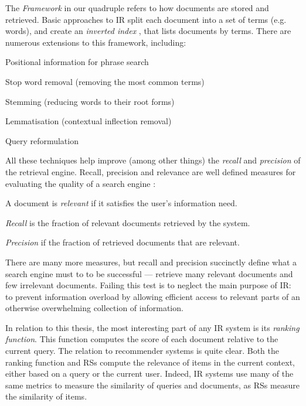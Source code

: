 The \emph{Framework} in our quadruple refers to how documents are stored and retrieved.
Basic approaches to IR split each document into a set of terms (e.g. words),
and create an \emph{inverted index}
\cite[p.22]{Manning2008},
that lists documents by terms.
There are numerous extensions to this framework, including: 

\begin{itemize*}
  \item Positional information for phrase search \cite[p.39]{Manning2008}
  \item Stop word removal (removing the most common terms) \cite[p.27]{Manning2008}
  \item Stemming (reducing words to their root forms) \cite[p.32]{Manning2008}
  \item Lemmatisation (contextual inflection removal) \cite[p.32]{Manning2008}
  \item Query reformulation \citep[p.117]{Baeza-Yates1999}
\end{itemize*}

All these techniques help improve (among other things)
the \emph{recall} and \emph{precision} of the retrieval engine. 
Recall, precision and relevance are well defined measures for evaluating the quality of a search engine \cite[p.5]{Manning2008}:

\begin{itemize*}
  \item A document is \emph{relevant} if it satisfies the user's information need.
  \item \emph{Recall} is the fraction of relevant documents retrieved by the system.
  \item \emph{Precision} if the fraction of retrieved documents that are relevant.
\end{itemize*}

There are many more measures, but recall and precision succinctly define what a search engine must to
to be successful --- retrieve many relevant documents and few irrelevant documents.
Failing this test is to neglect the main purpose of IR:
to prevent information overload by allowing efficient access 
to relevant parts of an otherwise overwhelming collection of information.

In relation to this thesis, the most interesting part of any IR system is its \emph{ranking function}.
This function computes the score of each document relative to the current query. 
The relation to recommender systems is quite clear. Both the ranking function and RSs
compute the relevance of items in the current context, either based on a query or the current user.
Indeed, IR systems use many of the same metrics to measure the similarity of queries and documents,
as RSs measure the similarity of items.

